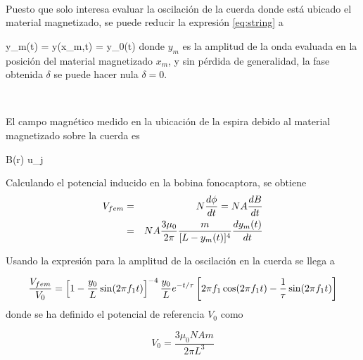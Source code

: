 \

Puesto que solo interesa evaluar la oscilación de la cuerda donde está 
ubicado el material magnetizado, se puede reducir la expresión \ref{eq:string}
a

{y_m(t) = y(x_m,t) = y_0(t)\sin{} }
donde $y_m$ es la amplitud de la onda evaluada en la posición del material
magnetizado $x_m$, y sin pérdida de generalidad, la fase obtenida $\delta$
se puede hacer nula $\delta = 0$.

\

El campo magnético medido en la ubicación de la espira debido al material
magnetizado sobre la cuerda es 

{\bds B(\bds r) \approx {}\bds u_j}

Calculando el potencial inducido en la bobina fonocaptora, se obtiene
\begin{eqnarray}
V_{fem} &=& N\frac{ d \phi }{d t} = NA\frac{ d B }{d t} \\
&=& NA \frac{3\mu_0}{2 \pi}{\frac{m}{[L-y_m(t)]^4} }\frac{ d y_m(t) }{d t}
\end{eqnarray}


Usando la expresión para la amplitud de la oscilación en la cuerda se llega
a

\begin{eqnarray}
\frac{V_{fem}}{V_0 } = 
\left[  1 - \frac{y_0}{L}\sin( 2\pi f_1 t )  \right]^{-4}\frac{y_0}{L}
e^{-t/\tau}\left[  2\pi f_1 \cos(2\pi f_1 t) - \frac{1}{\tau}\sin( 2\pi f_1 t )  \right]
\end{eqnarray}
donde se ha definido el potencial de referencia $V_0$ como

\[ V_0 = \frac{3\mu_0 NAm }{2\pi L^3} \]

